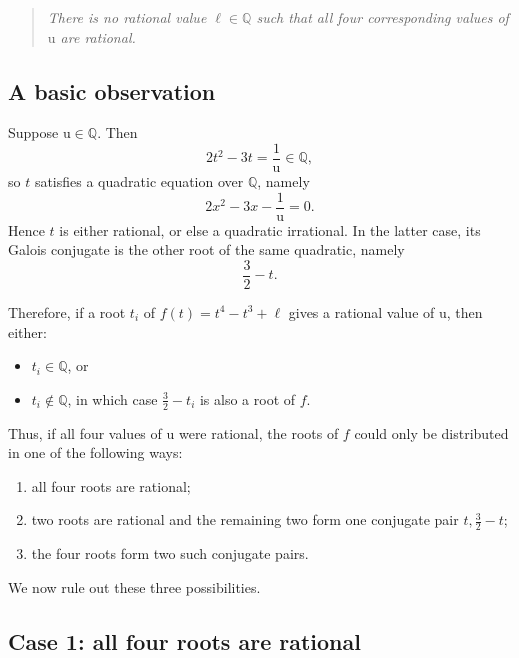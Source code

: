 \documentclass[11pt, a4paper]{article}
\newcommand{\ur}{\mathrm{u}}
\numberwithin{equation}{section}
\begin{document}
\begin{quote}
\emph{There is no rational value \(\ell\in \mathbb{Q}\) such that all four corresponding values of \(\ur\) are rational.}
\end{quote}

\subsection*{A basic observation}

Suppose \(\ur\in \mathbb{Q}\). Then
\begin{equation}
2t^2-3t=\frac{1}{\ur}\in \mathbb{Q},
\end{equation}
so \(t\) satisfies a quadratic equation over \(\mathbb{Q}\), namely
\begin{equation}
2x^2-3x-\frac{1}{\ur}=0.
\end{equation}
Hence \(t\) is either rational, or else a quadratic irrational. In the latter case, its Galois conjugate is the other root of the same quadratic, namely
\begin{equation}
\frac{3}{2}-t.
\end{equation}

Therefore, if a root \(t_i\) of \(f(t)=t^4-t^3+\ell\) gives a rational value of \(\ur\), then either:
\begin{itemize}
    \item \(t_i\in \mathbb{Q}\), or
    \item \(t_i\notin \mathbb{Q}\), in which case \(\frac32-t_i\) is also a root of \(f\).
\end{itemize}

Thus, if all four values of \(\ur\) were rational, the roots of \(f\) could only be distributed in one of the following ways:
\begin{enumerate}
    \item all four roots are rational;
    \item two roots are rational and the remaining two form one conjugate pair \(t,\frac32-t\);
    \item the four roots form two such conjugate pairs.
\end{enumerate}
We now rule out these three possibilities.

\subsection*{Case 1: all four roots are rational}
\end{document}
